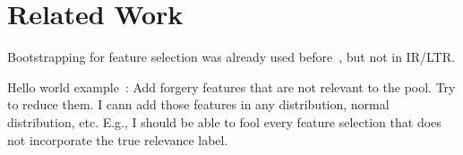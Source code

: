 \section{Related Work}

Bootstrapping for feature selection was already used before~\cite{yuan:99}, but not in IR/LTR.


Hello world example~\cite{yuan:99}: Add forgery features that are not relevant to the pool. Try to reduce them. I cann add those features in any distribution, normal distribution, etc. E.g., I should be able to fool every feature selection that does not incorporate the true relevance label.

